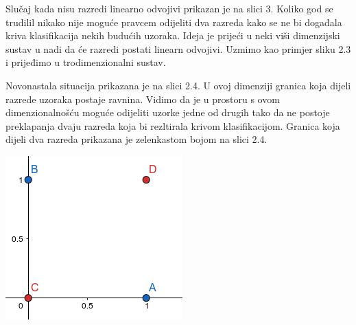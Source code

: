 \documentclass[times, utf8, zavrsni]{fer}
\begin{document}
\begin{multicols}{2}
Slučaj kada nisu razredi linearno odvojivi prikazan je na slici 3. Koliko god se trudilil nikako 
nije moguće pravcem odijeliti dva razreda kako se ne bi događala kriva klasifikacija nekih 
budućih uzoraka. Ideja je prijeći u neki viši dimenzijski sustav u nadi da će razredi postati 
linearn odvojivi. Uzmimo kao primjer sliku 2.3 i prijeđimo u trodimenzionalni sustav. 

\bigbreak

Novonastala situacija prikazana je na slici 2.4. U ovoj dimenziji granica koja dijeli razrede uzoraka 
postaje ravnina. Vidimo da je u prostoru s ovom dimenzionalnošću moguće odijeliti uzorke jedne 
od drugih tako da ne postoje preklapanja dvaju razreda koja bi rezltirala krivom klasifikacijom.
Granica koja dijeli dva razreda prikazana je zelenkastom bojom na slici 2.4.

\begin{minipage}{\linewidth}
\vspace{10pt}
\centering
\includegraphics[width=0.8\linewidth]{img/neseparabilni.png}
\end{minipage}


\end{multicols}
\end{document}
